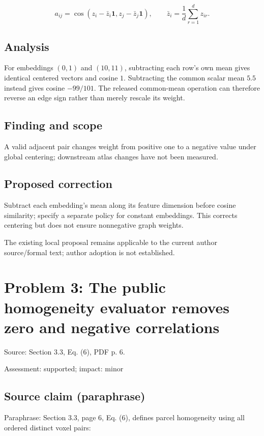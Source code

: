 \documentclass[11pt]{article}
\begin{document}
\[a_{ij}=\cos(z_i-\bar z_i\mathbf1,z_j-\bar z_j\mathbf1), \qquad \bar z_i=\frac1d\sum_{r=1}^d z_{ir}. \]

\subsection*{Analysis}

For embeddings \((0,1)\) and \((10,11)\), subtracting each row's own mean gives identical centered vectors and cosine \(1\). Subtracting the common scalar mean \(5.5\) instead gives cosine \(-99/101\). The released common-mean operation can therefore reverse an edge sign rather than merely rescale its weight.

\subsection*{Finding and scope}

A valid adjacent pair changes weight from positive one to a negative value under global centering; downstream atlas changes have not been measured.

\subsection*{Proposed correction}

Subtract each embedding’s mean along its feature dimension before cosine similarity; specify a separate policy for constant embeddings. This corrects centering but does not ensure nonnegative graph weights.

The existing local proposal remains applicable to the current author source/formal text; author adoption is not established.

\section*{Problem 3: The public homogeneity evaluator removes zero and negative correlations}

Source: Section 3.3, Eq. (6), PDF p. 6.

Assessment: supported; impact: minor

\subsection*{Source claim (paraphrase)}

Paraphrase: Section 3.3, page 6, Eq. (6), defines parcel homogeneity using all ordered distinct voxel pairs:
\end{document}
